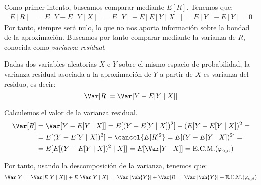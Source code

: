Como primer intento, buscamos comparar mediante $E[R]$. Tenemos que:
\begin{align*}
    E[R] &= E[Y - E[Y\mid X]] = E[Y] - E[E[Y\mid X]] = E[Y] - E[Y] = 0
\end{align*}
Por tanto, siempre será nulo, lo que no nos aporta información sobre la bondad de la aproximación. Buscamos por tanto comparar mediante la varianza de $R$, conocida como \emph{varianza residual}.
\begin{definicion}
    Dadas dos variables aleatorias $X$ e $Y$ sobre el mismo espacio de probabilidad, la varianza residual asociada a la aproximación de $Y$ a partir de $X$ es varianza del residuo, es decir:
    \begin{equation*}
        \Var[R] = \Var[Y - E[Y\mid X]]
    \end{equation*}
\end{definicion}

Calculemos el valor de la varianza residual.
\begin{align*}
    \Var[R] &= \Var[Y - E[Y\mid X]] = E[(Y - E[Y\mid X])^2] - (E[Y - E[Y\mid X])^2 =\\
    &= E[(Y - E[Y\mid X])^2] - \cancel{E[R]^2} = E[(Y - E[Y\mid X])^2]
    =\\&= E[E[(Y - E[Y\mid X])^2\mid X]] = E[\Var[Y\mid X]] = \text{E.C.M.}(\varphi_{\text{opt}})
\end{align*}

Por tanto, usando la descomposición de la varianza, tenemos que:
\begin{equation}\label{eq:varianza_residual}
    \Var[Y] = \Var[E[Y\mid X]] + E[\Var[Y\mid X]] = \Var\left[\wh{Y}\right] + \Var[R]
    = \Var\left[\wh{Y}\right] + \text{E.C.M.}(\varphi_{\text{opt}})
\end{equation}

